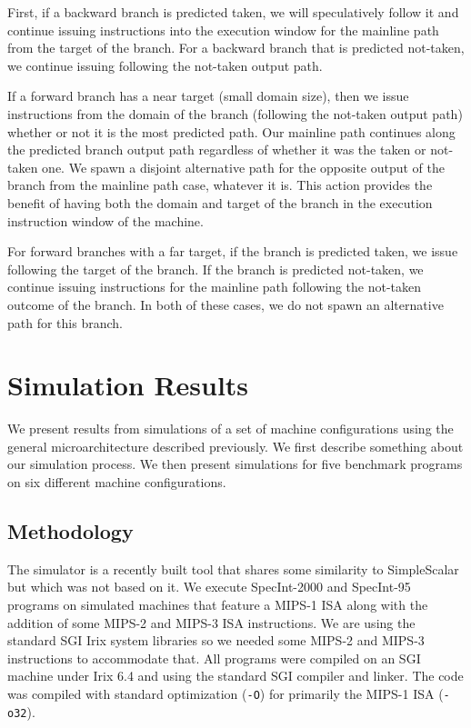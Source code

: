 \documentclass[10pt,dvips]{article}
\begin{document}
First, if a backward branch is predicted taken,
we will speculatively follow it and continue issuing instructions
into the execution window for the mainline path from the target
of the branch.  
For a backward branch that
is predicted not-taken, we continue issuing following the
not-taken output path.

If a forward branch has a near target (small domain size), then we
issue instructions from the domain of the branch (following the
not-taken output path) whether or not it is the most predicted path.
Our mainline path continues along the predicted branch output path
regardless of whether it was the taken or not-taken one.  
We spawn a disjoint
alternative path for the opposite output of the branch from
the mainline path case, whatever it is.
This action
provides the benefit of having both the domain and target of the branch
in the execution instruction window of the machine.  

For forward branches with a far target,
if the branch is predicted taken, we issue following the target
of the branch.  If the branch is predicted not-taken, we continue
issuing instructions for the mainline path following the not-taken
outcome of the branch.  In both of these cases, we do not
spawn an alternative path for this branch.
%
\section{Simulation Results}
%
We present results from simulations of a set of machine configurations
using the general microarchitecture described previously.
We first describe something about our simulation process.
We then present simulations for five benchmark programs
on six different machine configurations.
%
\subsection{Methodology}
%
The simulator is a recently built tool that shares some similarity
to SimpleScalar \cite{Austin97} but which was not based on it.
We execute
SpecInt-2000 and SpecInt-95 programs on simulated machines
that feature a MIPS-1 ISA along with the addition of some MIPS-2 and
MIPS-3 ISA instructions.  We are using the standard SGI Irix system
libraries so we needed some MIPS-2 and MIPS-3 instructions to accommodate
that.  All programs were compiled on an SGI machine under Irix 6.4 and
using the standard SGI compiler and linker.  The code was compiled with
standard optimization ({\tt -O}) for primarily the MIPS-1 ISA ({\tt -o32}).
%
\end{document}
